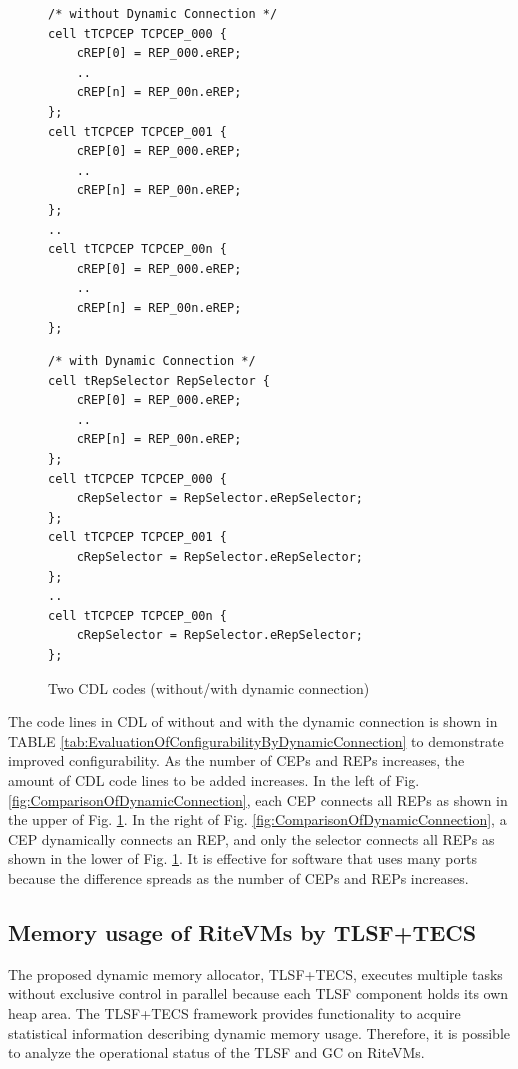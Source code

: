 \documentclass[JIP]{ipsj_v2/UTF8/ipsj}
\begin{document}
\begin{figure}[t]
 \centering
 \begin{lstlisting}
/* without Dynamic Connection */
cell tTCPCEP TCPCEP_000 {
    cREP[0] = REP_000.eREP;
    ..
    cREP[n] = REP_00n.eREP;
};
cell tTCPCEP TCPCEP_001 {
    cREP[0] = REP_000.eREP;
    ..
    cREP[n] = REP_00n.eREP;
};
..
cell tTCPCEP TCPCEP_00n {
    cREP[0] = REP_000.eREP;
    ..
    cREP[n] = REP_00n.eREP;
};
 \end{lstlisting}
 \centering
 \begin{lstlisting}
/* with Dynamic Connection */
cell tRepSelector RepSelector {
    cREP[0] = REP_000.eREP;
    ..
    cREP[n] = REP_00n.eREP;
};
cell tTCPCEP TCPCEP_000 {
    cRepSelector = RepSelector.eRepSelector;
};
cell tTCPCEP TCPCEP_001 {
    cRepSelector = RepSelector.eRepSelector;
};
..
cell tTCPCEP TCPCEP_00n {
    cRepSelector = RepSelector.eRepSelector;
};
 \end{lstlisting}
 \caption{Two CDL codes (without/with dynamic connection)}
 \label{src:ComparisonOfCDL}
\end{figure}

The code lines in CDL of without and with the dynamic connection is shown in TABLE \ref{tab:EvaluationOfConfigurabilityByDynamicConnection} to demonstrate improved configurability.
As the number of CEPs and REPs increases, the amount of CDL code lines to be added increases.
In the left of Fig. \ref{fig:ComparisonOfDynamicConnection}, each CEP connects all REPs as shown in the upper of Fig. \ref{src:ComparisonOfCDL}. 
In the right of Fig. \ref{fig:ComparisonOfDynamicConnection}, a CEP dynamically connects an REP, and only the selector connects all REPs as shown in the lower of Fig. \ref{src:ComparisonOfCDL}. 
It is effective for software that uses many ports because the difference spreads as the number of CEPs and REPs increases.


\subsection{Memory usage of RiteVMs by TLSF+TECS}

The proposed dynamic memory allocator, TLSF+TECS, executes multiple tasks without exclusive control in parallel because each TLSF component holds its own heap area.
The TLSF+TECS framework provides functionality to acquire statistical information describing dynamic memory usage.
Therefore, it is possible to analyze the operational status of the TLSF and GC on RiteVMs.
\end{document}
